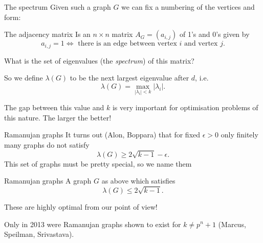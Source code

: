 \documentclass{beamer}
\begin{document}
\begin{frame}{The spectrum}
Given such a graph $G$ we can fix a numbering of the vertices and form:
\begin{block}{The adjacency matrix}
Is an $n\times n$ matrix $A_G = (a_{i,j})$ of 1's and 0's given by
\[a_{i,j} = 1 \iff \text{ there is an edge between vertex $i$ and vertex $j$}.\]
\end{block}
\pause What is the set of eigenvalues (the \emph{spectrum}) of this matrix?

\pause So we define $\lambda(G)$ to be the next largest eigenvalue after $d$, i.e.
\[\lambda(G) = \max_{|\lambda_i| < k} |\lambda_i|.\]

\pause The gap between this value and $k$ is very important for optimisation problems of this nature. The larger the better!
\end{frame}

\begin{frame}{Ramanujan graphs}
It turns out (Alon, Boppara) that for fixed $\epsilon > 0$ only finitely many graphs do not satisfy 
\[\lambda(G) \ge 2\sqrt{k-1} - \epsilon.\]
\pause This set of graphs must be pretty special, so we name them
\begin{block}{Ramanujan graphs}
A graph $G$ as above which satisfies
\[\lambda(G) \le 2\sqrt{k-1}.\]
\end{block}
These are highly optimal from our point of view! 

\pause Only in 2013 were Ramanujan graphs shown to exist for $k \ne p^n + 1$ (Marcus, Speilman, Srivastava).
\end{frame}
\end{document}
